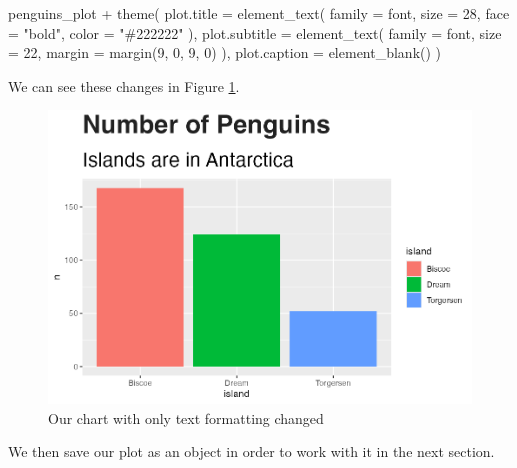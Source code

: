 \documentclass[
]{book}
\newenvironment{Shaded}{\begin{snugshade}}{\end{snugshade}}
\newcommand{\AttributeTok}[1]{\textcolor[rgb]{0.77,0.63,0.00}{#1}}
\newcommand{\DecValTok}[1]{\textcolor[rgb]{0.00,0.00,0.81}{#1}}
\newcommand{\FunctionTok}[1]{\textcolor[rgb]{0.00,0.00,0.00}{#1}}
\newcommand{\NormalTok}[1]{#1}
\newcommand{\SpecialCharTok}[1]{\textcolor[rgb]{0.00,0.00,0.00}{#1}}
\newcommand{\StringTok}[1]{\textcolor[rgb]{0.31,0.60,0.02}{#1}}
\begin{document}
\begin{Shaded}
\begin{Highlighting}[]
\NormalTok{penguins\_plot }\SpecialCharTok{+}
  \FunctionTok{theme}\NormalTok{(}
    \AttributeTok{plot.title =} \FunctionTok{element\_text}\NormalTok{(}
      \AttributeTok{family =}\NormalTok{ font,}
      \AttributeTok{size =} \DecValTok{28}\NormalTok{,}
      \AttributeTok{face =} \StringTok{"bold"}\NormalTok{,}
      \AttributeTok{color =} \StringTok{"\#222222"}
\NormalTok{    ),}
    \AttributeTok{plot.subtitle =} \FunctionTok{element\_text}\NormalTok{(}
      \AttributeTok{family =}\NormalTok{ font,}
      \AttributeTok{size =} \DecValTok{22}\NormalTok{,}
      \AttributeTok{margin =} \FunctionTok{margin}\NormalTok{(}\DecValTok{9}\NormalTok{, }\DecValTok{0}\NormalTok{, }\DecValTok{9}\NormalTok{, }\DecValTok{0}\NormalTok{)}
\NormalTok{    ),}
    \AttributeTok{plot.caption =} \FunctionTok{element\_blank}\NormalTok{()}
\NormalTok{  )}
\end{Highlighting}
\end{Shaded}

We can see these changes in Figure \ref{fig:penguins-plot-text-formatting-plot}.

\begin{figure}
\includegraphics[width=1\linewidth]{custom-theme_files/figure-latex/penguins-plot-text-formatting-plot-1} \caption{Our chart with only text formatting changed}\label{fig:penguins-plot-text-formatting-plot}
\end{figure}

We then save our plot as an object in order to work with it in the next section.
\end{document}
